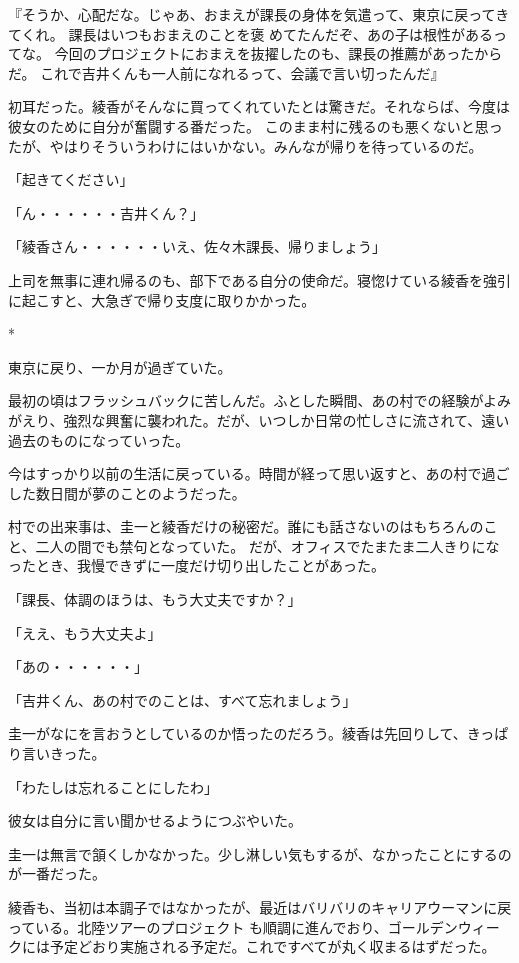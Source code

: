 ﻿\documentclass[book,tate]{jlreq}
\begin{document}
『そうか、心配だな。じゃあ、おまえが課長の身体を気遣って、東京に戻ってきてくれ。 課長はいつもおまえのことを褒 めてたんだぞ、あの子は根性があるってな。 今回のプロジェクトにおまえを抜擢したのも、課長の推薦があったからだ。 これで吉井くんも一人前になれるって、会議で言い切ったんだ』

初耳だった。綾香がそんなに買ってくれていたとは驚きだ。それならば、今度は彼女のために自分が奮闘する番だった。 このまま村に残るのも悪くないと思ったが、やはりそういうわけにはいかない。みんなが帰りを待っているのだ。

「起きてください」

「ん・・・・・・吉井くん？」

「綾香さん・・・・・・いえ、佐々木課長、帰りましょう」

上司を無事に連れ帰るのも、部下である自分の使命だ。寝惚けている綾香を強引に起こすと、大急ぎで帰り支度に取りかかった。

*

東京に戻り、一か月が過ぎていた。

最初の頃はフラッシュバックに苦しんだ。ふとした瞬間、あの村での経験がよみがえり、強烈な興奮に襲われた。だが、いつしか日常の忙しさに流されて、遠い過去のものになっていった。

今はすっかり以前の生活に戻っている。時間が経って思い返すと、あの村で過ごした数日間が夢のことのようだった。

村での出来事は、圭一と綾香だけの秘密だ。誰にも話さないのはもちろんのこと、二人の間でも禁句となっていた。 だが、オフィスでたまたま二人きりになったとき、我慢できずに一度だけ切り出したことがあった。

「課長、体調のほうは、もう大丈夫ですか？」

「ええ、もう大丈夫よ」

「あの・・・・・・」

「吉井くん、あの村でのことは、すべて忘れましょう」

圭一がなにを言おうとしているのか悟ったのだろう。綾香は先回りして、きっぱり言いきった。

「わたしは忘れることにしたわ」

彼女は自分に言い聞かせるようにつぶやいた。

圭一は無言で頷くしかなかった。少し淋しい気もするが、なかったことにするのが一番だった。

綾香も、当初は本調子ではなかったが、最近はバリバリのキャリアウーマンに戻っている。北陸ツアーのプロジェクト も順調に進んでおり、ゴールデンウィークには予定どおり実施される予定だ。これですべてが丸く収まるはずだった。
\end{document}
